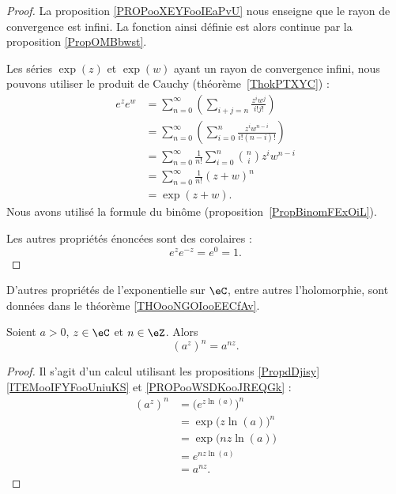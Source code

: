 \begin{proof}
	La proposition \ref{PROPooXEYFooIEaPvU} nous enseigne que le rayon de convergence est infini. La fonction ainsi définie est alors continue par la proposition \ref{PropOMBbwst}.

	Les séries \( \exp(z)\) et \( \exp(w)\) ayant un rayon de convergence infini, nous pouvons utiliser le produit de Cauchy (théorème~\ref{ThokPTXYC}) :
	\begin{subequations}
		\begin{align}
			e^{z} e^{w} & =\sum_{n=0}^{\infty}\left( \sum_{i+j=n}\frac{ z^iw^j }{ i!j! } \right)         \\
			            & =\sum_{n=0}^{\infty}\left( \sum_{i=0}^n\frac{ z^iw^{n-i} }{ i!(n-i)! } \right) \\
			            & =\sum_{n=0}^{\infty}\frac{1}{ n! }\sum_{i=0}^{n}{n\choose i}z^iw^{n-i}         \\
			            & =\sum_{n=0}^{\infty}\frac{1}{ n! }(z+w)^{n}                                    \\
			            & =\exp(z+w).
		\end{align}
	\end{subequations}
	Nous avons utilisé la formule du binôme (proposition~\ref{PropBinomFExOiL}).

	Les autres propriétés énoncées sont des corolaires :
	\begin{equation}
		e^{z} e^{-z}= e^{0}=1.
	\end{equation}
\end{proof}

D'autres propriétés de l'exponentielle sur \( \eC\), entre autres l'holomorphie, sont données dans le théorème \ref{THOooNGOIooEECfAv}.

\begin{lemma}        \label{LEMooTDGKooWdpUTD}
	Soient \( a>0\), \( z\in \eC\) et \( n\in \eZ\). Alors
	\begin{equation}
		(a^z)^n=a^{nz}.
	\end{equation}
\end{lemma}

\begin{proof}
	Il s'agit d'un calcul utilisant les propositions \ref{PropdDjisy}\ref{ITEMooIFYFooUniuKS} et \ref{PROPooWSDKooJREQGk} :
	\begin{subequations}
		\begin{align}
			(a^z)^n & =\big(  e^{z\ln(a)} \big)^n \\
			        & =\exp\big( z\ln(a) \big)^n  \\
			        & =\exp\big( nz\ln(a) \big)   \\
			        & = e^{nz\ln(a)}              \\
			        & =a^{nz}.
		\end{align}
	\end{subequations}
\end{proof}

